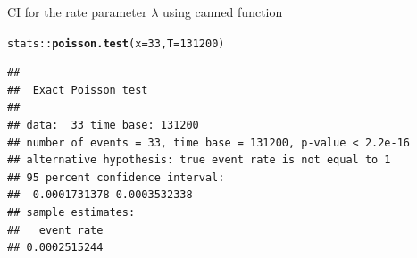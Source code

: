\documentclass{beamer}\usepackage[]{graphicx}\usepackage[]{color}
\newcommand{\hlnum}[1]{\textcolor[rgb]{0.686,0.059,0.569}{#1}}%
\newcommand{\hlopt}[1]{\textcolor[rgb]{0,0,0}{#1}}%
\newcommand{\hlstd}[1]{\textcolor[rgb]{0.345,0.345,0.345}{#1}}%
\newcommand{\hlkwc}[1]{\textcolor[rgb]{0.333,0.667,0.333}{#1}}%
\newcommand{\hlkwd}[1]{\textcolor[rgb]{0.737,0.353,0.396}{\textbf{#1}}}%
\newenvironment{knitrout}{}{} %
\begin{document}
\begin{frame}[fragile]{CI for the rate  parameter $\lambda$ using canned function}

\begin{knitrout}\scriptsize
{}\color{fgcolor}
\begin{alltt}
\hlstd{stats}\hlopt{::}\hlkwd{poisson.test}\hlstd{(}\hlkwc{x} \hlstd{=} \hlnum{33}\hlstd{,} \hlkwc{T} \hlstd{=} \hlnum{131200}\hlstd{)}
\end{alltt}
\begin{verbatim}
## 
## 	Exact Poisson test
## 
## data:  33 time base: 131200
## number of events = 33, time base = 131200, p-value < 2.2e-16
## alternative hypothesis: true event rate is not equal to 1
## 95 percent confidence interval:
##  0.0001731378 0.0003532338
## sample estimates:
##   event rate 
## 0.0002515244
\end{verbatim}

\end{knitrout}

\end{frame}
\end{document}
